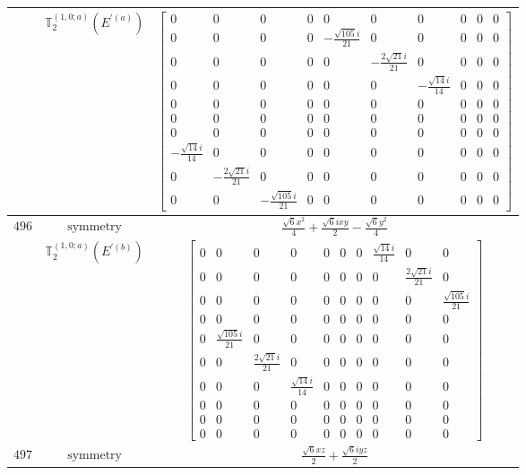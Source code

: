 \documentclass[fleqn,8pt,landscape]{jsarticle}
\begin{document}
\begin{longtable}{ccc}
$  $ & $ \mathbb{T}_{2}^{(1,0;a)}(E^{\prime(a)}) $ & $ \begin{bmatrix} 0 & 0 & 0 & 0 & 0 & 0 & 0 & 0 & 0 & 0 \\ 0 & 0 & 0 & 0 & - \frac{\sqrt{105} i}{21} & 0 & 0 & 0 & 0 & 0 \\ 0 & 0 & 0 & 0 & 0 & - \frac{2 \sqrt{21} i}{21} & 0 & 0 & 0 & 0 \\ 0 & 0 & 0 & 0 & 0 & 0 & - \frac{\sqrt{14} i}{14} & 0 & 0 & 0 \\ 0 & 0 & 0 & 0 & 0 & 0 & 0 & 0 & 0 & 0 \\ 0 & 0 & 0 & 0 & 0 & 0 & 0 & 0 & 0 & 0 \\ 0 & 0 & 0 & 0 & 0 & 0 & 0 & 0 & 0 & 0 \\ - \frac{\sqrt{14} i}{14} & 0 & 0 & 0 & 0 & 0 & 0 & 0 & 0 & 0 \\ 0 & - \frac{2 \sqrt{21} i}{21} & 0 & 0 & 0 & 0 & 0 & 0 & 0 & 0 \\ 0 & 0 & - \frac{\sqrt{105} i}{21} & 0 & 0 & 0 & 0 & 0 & 0 & 0 \end{bmatrix} $ \\ \hline
$ 496 $ & $ \text{symmetry} $ & $ \frac{\sqrt{6} x^{2}}{4} + \frac{\sqrt{6} i x y}{2} - \frac{\sqrt{6} y^{2}}{4} $ \\
$  $ & $ \mathbb{T}_{2}^{(1,0;a)}(E^{\prime(b)}) $ & $ \begin{bmatrix} 0 & 0 & 0 & 0 & 0 & 0 & 0 & \frac{\sqrt{14} i}{14} & 0 & 0 \\ 0 & 0 & 0 & 0 & 0 & 0 & 0 & 0 & \frac{2 \sqrt{21} i}{21} & 0 \\ 0 & 0 & 0 & 0 & 0 & 0 & 0 & 0 & 0 & \frac{\sqrt{105} i}{21} \\ 0 & 0 & 0 & 0 & 0 & 0 & 0 & 0 & 0 & 0 \\ 0 & \frac{\sqrt{105} i}{21} & 0 & 0 & 0 & 0 & 0 & 0 & 0 & 0 \\ 0 & 0 & \frac{2 \sqrt{21} i}{21} & 0 & 0 & 0 & 0 & 0 & 0 & 0 \\ 0 & 0 & 0 & \frac{\sqrt{14} i}{14} & 0 & 0 & 0 & 0 & 0 & 0 \\ 0 & 0 & 0 & 0 & 0 & 0 & 0 & 0 & 0 & 0 \\ 0 & 0 & 0 & 0 & 0 & 0 & 0 & 0 & 0 & 0 \\ 0 & 0 & 0 & 0 & 0 & 0 & 0 & 0 & 0 & 0 \end{bmatrix} $ \\ \hline
$ 497 $ & $ \text{symmetry} $ & $ \frac{\sqrt{6} x z}{2} + \frac{\sqrt{6} i y z}{2} $ \\

\end{longtable}
\end{document}
